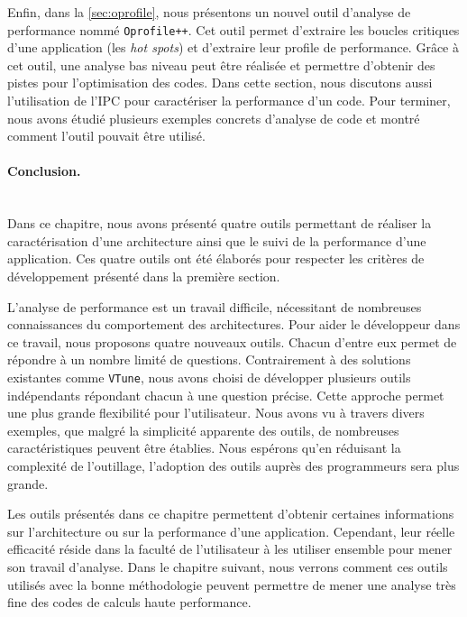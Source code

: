     Enfin, dans la \autoref{sec:oprofile}, nous présentons un nouvel outil d'analyse de performance nommé \verb=Oprofile++=. Cet outil permet d'extraire les boucles critiques d'une application (les \textit{hot spots}) et d'extraire leur profile de performance. Grâce à cet outil, une analyse bas niveau peut être réalisée et permettre d'obtenir des pistes pour l'optimisation des codes. Dans cette section, nous discutons aussi l'utilisation de l'IPC pour caractériser la performance d'un code. Pour terminer, nous avons étudié plusieurs exemples concrets d'analyse de code et montré comment l'outil pouvait être utilisé.
    
    
\paragraph{Conclusion.}
~\\
    
    Dans ce chapitre, nous avons présenté quatre outils permettant de réaliser la caractérisation d'une architecture ainsi que le suivi de la performance d'une application. Ces quatre outils ont été élaborés pour respecter les critères de développement présenté dans la première section. 
    
    L'analyse de performance est un travail difficile, nécessitant de nombreuses connaissances du comportement des architectures. Pour aider le développeur dans ce travail, nous proposons quatre nouveaux outils. Chacun d'entre eux permet de répondre à un nombre limité de questions. Contrairement à des solutions existantes comme \verb|VTune|, nous avons choisi de développer plusieurs outils indépendants répondant chacun à une question précise. Cette approche permet une plus grande flexibilité pour l'utilisateur. Nous avons vu à travers divers exemples, que malgré la simplicité apparente des outils, de nombreuses caractéristiques peuvent être établies. Nous espérons qu'en réduisant la complexité de l'outillage, l'adoption des outils auprès des programmeurs sera plus grande.
    
    Les outils présentés dans ce chapitre permettent d'obtenir certaines informations sur l'architecture ou sur la performance d'une application. Cependant, leur réelle efficacité réside dans la faculté de l'utilisateur à les utiliser ensemble pour mener son travail d'analyse. Dans le chapitre suivant, nous verrons comment ces outils utilisés avec la bonne méthodologie peuvent permettre de mener une analyse très fine des codes de calculs haute performance.